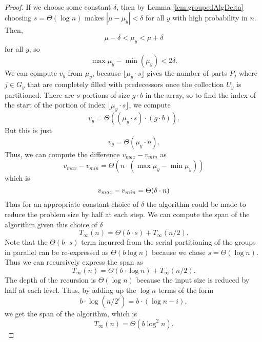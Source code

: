 \documentclass[twocolumn, twoside, 12pt]{article}
\DeclarePairedDelimiter{\paren}{(}{)}
\begin{document}
\begin{proof}
If we choose some constant $\delta$, then by Lemma \ref{lem:groupedAlgDelta} choosing $s = \Theta(\log n)$ makes ${|\mu - \mu_y| < \delta}$ for all $y$ with high probability in $n$. 
Then,
$$\mu - \delta < \mu_y < \mu + \delta$$
for all $y$, so 
	$$\max{\mu_y} - \min(\mu_y) < 2\delta. $$
We can compute $v_y$ from $\mu_y$, because $\lfloor \mu_y\cdot s \rfloor$ gives the number of parts $P_j$ where $j \in G_y$ that are completely filled with predecessors once the collection $U_y$ is partitioned. 
There are $s$ portions of size $g\cdot b$ in the array, so to find the index of the start of the portion of index $\lfloor \mu_y\cdot s \rfloor$, we compute
	$$v_y = \Theta((\mu_y \cdot s)\cdot (g\cdot b)).$$
	But this is just 
	$$v_y = \Theta(\mu_y \cdot n).$$
	Thus, we can compute the difference ${v_{max} - v_{min}}$ as 
	$$v_{max} - v_{min} = \Theta(n \cdot (\max{\mu_y} - \min{\mu_y}))$$
which is
	$$v_{max} - v_{min} = \Theta\paren*{\delta\cdot n}$$
	Thus for an appropriate constant choice of $\delta$ the algorithm could be made to reduce the problem size by half at each step. We can compute the span of the algorithm given this choice of $\delta$
$$T_{\infty}(n) = \Theta(b\cdot s)+T_{\infty}(n/2).$$
	Note that the $\Theta(b\cdot s)$ term incurred from the serial partitioning of the groups in parallel can be re-expressed as $\Theta(b \log n)$ because we chose $s=\Theta(\log n)$.
Thus we can recursively express the span as 
$$T_{\infty}(n) = \Theta(b\cdot \log n)+T_{\infty}(n/2).$$
	The depth of the recursion is $\Theta(\log n)$ because the input size is reduced by half at each level. Thus, by adding up the $\log n$ terms of the form $$b \cdot \log (n/2^i) = b\cdot (\log n - i), $$
we get the span of the algorithm, which is 
	$$T_{\infty}(n) = \Theta(b\log^2 n).$$
\end{proof}
\end{document}
